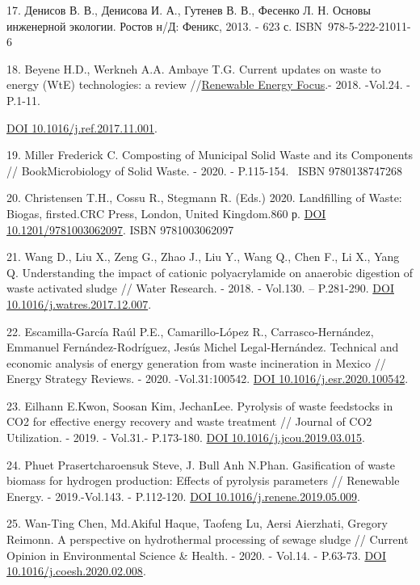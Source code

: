 \begin{references}
17. Денисов В. В., Денисова И. А., Гутенев В. В., Фесенко Л. Н. Основы
инженерной экологии. Ростов н/Д: Феникс, 2013. - 623 с.
ISBN~978-5-222-21011-6

18. Beyene H.D., Werkneh A.A. Ambaye T.G. Current updates on waste to
energy (WtE) technologies: a review
//\href{https://www.sciencedirect.com/journal/renewable-energy-focus}{Renewable
Energy Focus}.- 2018. -Vol.24. -P.1-11.

\href{https://doi.org/10.1016/j.ref.2017.11.001}{DOI
10.1016/j.ref.2017.11.001}.

19. Miller Frederick C. Composting of Municipal Solid Waste and its
Components // BookMicrobiology of Solid Waste. - 2020. - P.115-154.
~ISBN 9780138747268

20. Christensen T.H., Cossu R., Stegmann R. (Eds.) 2020. Landfilling of
Waste: Biogas, firsted.CRC Press, London, United Kingdom.860 р.
\href{https://doi.org/10.1201/9781003062097}{DOI 10.1201/9781003062097}.
ISBN 9781003062097

21. Wang D., Liu X., Zeng G., Zhao J., Liu Y., Wang Q., Chen F., Li X.,
Yang Q. Understanding the impact of cationic polyacrylamide on anaerobic
digestion of waste activated sludge // Water Research. - 2018. -
Vol.130. -- P.281-290.
\href{https://doi.org/10.1016/j.watres.2017.12.007}{DOI
10.1016/j.watres.2017.12.007}.

22. Escamilla-García Raúl P.E., Camarillo-López R., Carrasco-Hernández,
Emmanuel Fernández-Rodríguez, Jesús Michel Legal-Hernández. Technical
and economic analysis of energy generation from waste incineration in
Mexico // Energy Strategy Reviews. - 2020. -Vol.31:100542.
\href{https://doi.org/10.1016/j.esr.2020.100542}{DOI
10.1016/j.esr.2020.100542}.

23. Eilhann E.Kwon, Soosan Kim, JechanLee. Pyrolysis of waste feedstocks
in CO2 for effective energy recovery and waste treatment // Journal of
CO2 Utilization. - 2019. - Vol.31.- P.173-180.
\href{https://doi.org/10.1016/j.jcou.2019.03.015}{DOI
10.1016/j.jcou.2019.03.015}.

24. Phuet Prasertcharoensuk Steve, J. Bull Anh N.Phan. Gasification of
waste biomass for hydrogen production: Effects of pyrolysis parameters
// Renewable Energy. - 2019.-Vol.143. - P.112-120.
\href{https://doi.org/10.1016/j.renene.2019.05.009}{DOI
10.1016/j.renene.2019.05.009}.

25. Wan-Ting Chen, Md.Akiful Haque, Taofeng Lu, Aersi Aierzhati, Gregory
Reimonn. A perspective on hydrothermal processing of sewage sludge //
Current Opinion in Environmental Science \& Health. - 2020. - Vol.14. -
P.63-73. \href{https://doi.org/10.1016/j.coesh.2020.02.008}{DOI
10.1016/j.coesh.2020.02.008}.


\end{references}
